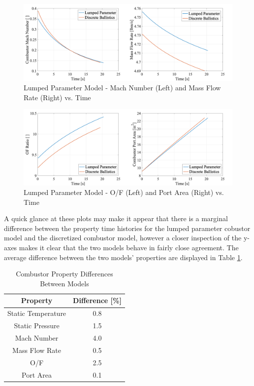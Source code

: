 \begin{figure}[H]
\centering
\includegraphics[width=1\textwidth] {Combustor_Figures/LPA_2.png}
\caption{Lumped Parameter Model - Mach Number (Left) and Mass Flow Rate (Right) vs. Time}
\label{fig:LPA_2}
\end{figure}

\begin{figure}[H]
\centering
\includegraphics[width=1\textwidth] {Combustor_Figures/LPA_3.png}
\caption{Lumped Parameter Model - O/F (Left) and Port Area (Right) vs. Time}
\label{fig:LPA_3}
\end{figure}

A quick glance at these plots may make it appear that there is a marginal difference between the property time histories for the lumped parameter cobustor model and the discretized combustor model, however a closer inspection of the y-axes makes it clear that the two models behave in fairly close agreement. The average difference between the two models' properties are displayed in Table \ref{tab:LPAvsDiscrete}.

\begin{table}
    \centering
    \caption{Combustor Property Differences Between Models}
    \begin{tabular}{c|c}
    \textbf{Property} & \textbf{Difference [\%]} \\
    \hline
        Static Temperature & 0.8 \\ 
        Static Pressure & 1.5 \\ 
        Mach Number & 4.0 \\ 
        Mass Flow Rate & 0.5 \\ 
        O/F & 2.5 \\ 
        Port Area & 0.1
    \end{tabular}
    \label{tab:LPAvsDiscrete}
\end{table}

